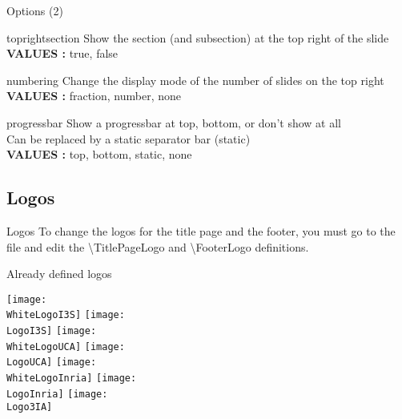\documentclass[aspectratio=43]{beamer}
\begin{document}
\begin{frame}{Options (2)}

    \begin{cblock}[yellow]{toprightsection}
        Show the section (and subsection) at the top right of the slide\\
        \textbf{VALUES :} true, false
    \end{cblock}\nline

    \begin{cblock}[orange]{numbering}
        Change the display mode of the number of slides on the top right\\
        \textbf{VALUES :} fraction, number, none
    \end{cblock}\nline

    \begin{cblock}[red]{progressbar}
        Show a progressbar at top, bottom, or don't show at all\\
        Can be replaced by a static separator bar (static)\\
        \textbf{VALUES :} top, bottom, static, none
    \end{cblock}

\end{frame}

\subsection{Logos}

\begin{frame}{Logos}
    To change the logos for the title page and the footer, you must go to the  file and edit the \textbackslash TitlePageLogo and \textbackslash FooterLogo definitions.\nline 

    \begin{exampleblock}{Already defined logos}

        \texttt{[image: \\WhiteLogoI3S]}
        \hfill
        \texttt{[image: \\LogoI3S]}
        \hfill
        \texttt{[image: \\WhiteLogoUCA]}
        \hfill
        \texttt{[image: \\LogoUCA]}
        \hfill
        \texttt{[image: \\WhiteLogoInria]}
        \hfill
        \texttt{[image: \\LogoInria]}
        \hfill
        \texttt{[image: \\Logo3IA]}

    \end{exampleblock}
\end{frame}

\end{document}
